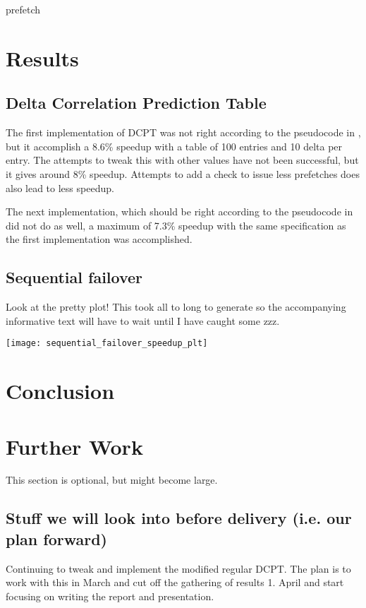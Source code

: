 \documentclass[12pt,journal,compsoc]{IEEEtran}
\begin{document}
\begin{algorithm}[H]
\dontprintsemicolon
{}

\caption{prefetch\label{pre}}
\end{algorithm}


\section{Results}
\subsection{Delta Correlation Prediction Table}
The first implementation of DCPT was not right according to the pseudocode in \cite{dcptpaper}, but it accomplish a 8.6\% speedup with a table of 100 entries and 10 delta per entry.
The attempts to tweak this with other values have not been successful, but it gives around 8\% speedup.
Attempts to add a check to issue less prefetches does also lead to less speedup.

The next implementation, which should be right according to the pseudocode in \cite{dcptpaper} did not do as well, a maximum of 7.3\% speedup with the same specification as the first implementation was accomplished.

\subsection{Sequential failover}
Look at the pretty plot! This took all to long to generate so the accompanying
informative text will have to wait until I have caught some zzz.

\texttt{[image: sequential\_failover\_speedup\_plt]}

\section{Conclusion}

\section{Further Work}
This section is optional, but might become large.

\subsection{Stuff we will look into before delivery (i.e. our plan forward)}
Continuing to tweak and implement the modified regular DCPT. The plan is
to work with this in March and cut off the gathering of results 1. April
and start focusing on writing the report and presentation.
\end{document}
